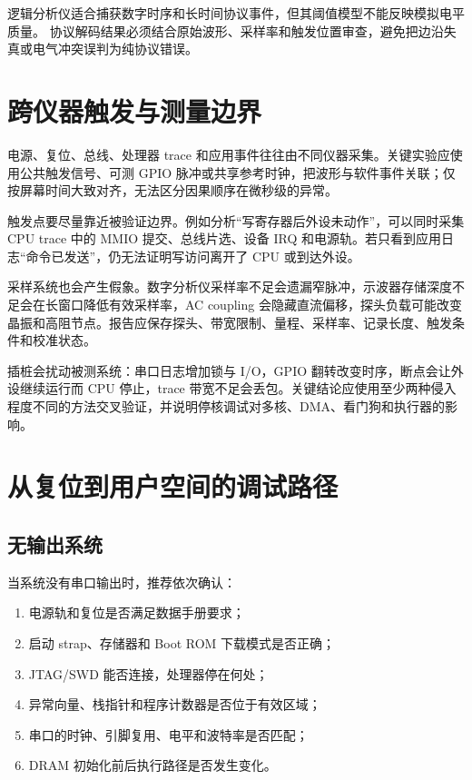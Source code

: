 逻辑分析仪适合捕获数字时序和长时间协议事件，但其阈值模型不能反映模拟电平质量。
协议解码结果必须结合原始波形、采样率和触发位置审查，避免把边沿失真或电气冲突误判为纯协议错误。

\section{跨仪器触发与测量边界}

电源、复位、总线、处理器 trace 和应用事件往往由不同仪器采集。关键实验应使用公共触发信号、可测 GPIO 脉冲或共享参考时钟，把波形与软件事件关联；仅按屏幕时间大致对齐，无法区分因果顺序在微秒级的异常。

触发点要尽量靠近被验证边界。例如分析“写寄存器后外设未动作”，可以同时采集 CPU trace 中的 MMIO 提交、总线片选、设备 IRQ 和电源轨。若只看到应用日志“命令已发送”，仍无法证明写访问离开了 CPU 或到达外设。

采样系统也会产生假象。数字分析仪采样率不足会遗漏窄脉冲，示波器存储深度不足会在长窗口降低有效采样率，AC coupling 会隐藏直流偏移，探头负载可能改变晶振和高阻节点。报告应保存探头、带宽限制、量程、采样率、记录长度、触发条件和校准状态。

插桩会扰动被测系统：串口日志增加锁与 I/O，GPIO 翻转改变时序，断点会让外设继续运行而 CPU 停止，trace 带宽不足会丢包。关键结论应使用至少两种侵入程度不同的方法交叉验证，并说明停核调试对多核、DMA、看门狗和执行器的影响。

\section{从复位到用户空间的调试路径}

\subsection{无输出系统}

当系统没有串口输出时，推荐依次确认：
\begin{enumerate}
  \item 电源轨和复位是否满足数据手册要求；
  \item 启动 strap、存储器和 Boot ROM 下载模式是否正确；
  \item JTAG/SWD 能否连接，处理器停在何处；
  \item 异常向量、栈指针和程序计数器是否位于有效区域；
  \item 串口的时钟、引脚复用、电平和波特率是否匹配；
  \item DRAM 初始化前后执行路径是否发生变化。
\end{enumerate}


